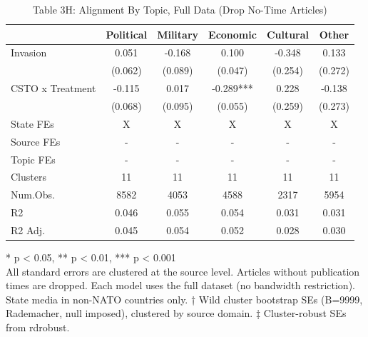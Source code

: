 \begin{table}[t]
\caption{\label{tab:table3h}Table 3H: Alignment By Topic, Full Data (Drop No-Time Articles)} 
\fontsize{12.0pt}{14.0pt}\selectfont
\begin{tabular*}{\linewidth}{@{\extracolsep{\fill}}lccccc}
\toprule
  & Political & Military & Economic & Cultural & Other \\ 
\midrule\addlinespace[2.5pt]
Invasion & 0.051 & -0.168 & 0.100 & -0.348 & 0.133 \\ 
 & (0.062) & (0.089) & (0.047) & (0.254) & (0.272) \\ 
CSTO x Treatment & -0.115 & 0.017 & -0.289*** & 0.228 & -0.138 \\ 
{} & {(0.068)} & {(0.095)} & {(0.055)} & {(0.259)} & {(0.273)} \\ 
State FEs & X & X & X & X & X \\ 
Source FEs & - & - & - & - & - \\ 
Topic FEs & - & - & - & - & - \\ 
Clusters & 11 & 11 & 11 & 11 & 11 \\ 
Num.Obs. & 8582 & 4053 & 4588 & 2317 & 5954 \\ 
R2 & 0.046 & 0.055 & 0.054 & 0.031 & 0.031 \\ 
R2 Adj. & 0.045 & 0.054 & 0.052 & 0.028 & 0.030 \\ 
\bottomrule
\end{tabular*}
\begin{minipage}{\linewidth}
\vspace{.05em}
* p < 0.05, ** p < 0.01, *** p < 0.001\\
All standard errors are clustered at the source level. Articles without
publication times are dropped. Each model uses the full dataset (no bandwidth
restriction). State media in non-NATO countries only. † Wild cluster bootstrap
SEs (B=9999, Rademacher, null imposed), clustered by source domain. ‡
Cluster-robust SEs from rdrobust.\\
\end{minipage}
\end{table}

